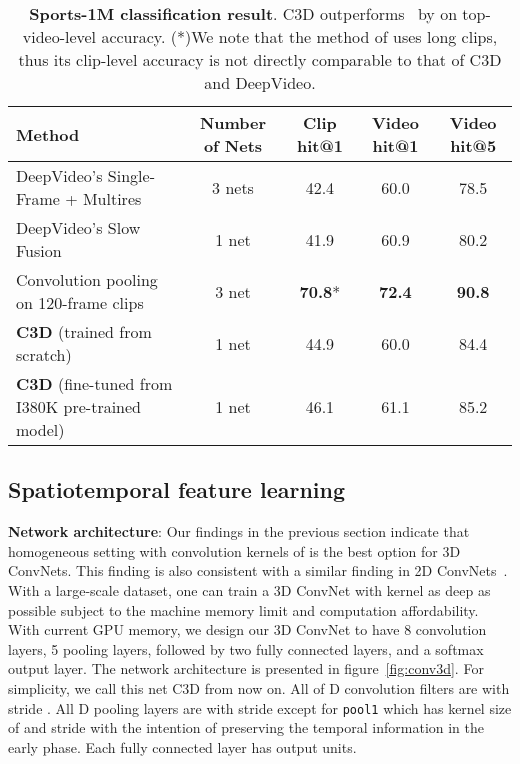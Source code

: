 \documentclass[10pt,twocolumn,letterpaper]{article}
\begin{document}
\begin{table*}
\begin{center}

\begin{tabular}{|l|c|c|c|c|}
\hline
{\bf Method} & {\bf Number of Nets} & {\bf Clip hit@1} & {\bf Video hit@1} & {\bf Video hit@5}\\ 
\hline
DeepVideo's Single-Frame + Multires~\cite{Karpathy14} & 3 nets & 42.4 & 60.0 & 78.5 \\
DeepVideo's Slow Fusion~\cite{Karpathy14} & 1 net & 41.9 & 60.9 & 80.2 \\
Convolution pooling on 120-frame clips~\cite{Ng15} & 3 net & {\bf 70.8}* & {\bf 72.4} & {\bf 90.8}\\
{\bf C3D} (trained from scratch) & 1 net & 44.9 & 60.0 & 84.4 \\
{\bf C3D} (fine-tuned from I380K pre-trained model) & 1 net & 46.1 & 61.1 & 85.2\\
\hline
\end{tabular}
\end{center}
\vspace{-6pt}
\caption{{\bf Sports-1M classification result}. C3D outperforms~\cite{Karpathy14} by  on top- video-level accuracy. (*)We note that the method of \cite{Ng15} uses long clips, thus its clip-level accuracy is not directly comparable to that of C3D and DeepVideo.}
\label{tab:sport1m_result}
\vspace{-6pt}
\end{table*}


\subsection{Spatiotemporal feature learning}

{\bf Network architecture}: Our findings in the previous section indicate that homogeneous setting with convolution kernels of  is the best option for 3D ConvNets. This finding is also consistent with a similar finding in 2D ConvNets~\cite{SimonyanZ14a}. With a large-scale dataset, one can train a 3D ConvNet with  kernel as deep as possible subject to the machine memory limit and computation affordability. With current GPU memory, we design our 3D ConvNet to have 8 convolution layers, 5 pooling layers, followed by two fully connected layers, and a softmax output layer. The network architecture is presented in figure~\ref{fig:conv3d}. For simplicity, we call this net C3D from now on. All of D convolution filters are  with stride . All D pooling layers are  with stride  except for \texttt{pool1} which has kernel size of  and stride  with the intention of preserving the temporal information in the early phase. Each fully connected layer has  output units.
\end{document}
